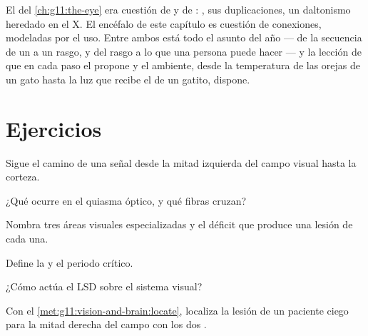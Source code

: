 \begin{remark}\label{rem:g11:vision-and-brain:year}
El  del \cref{ch:g11:the-eye} era cuestión de  y de :
, sus duplicaciones, un daltonismo heredado en el X. El encéfalo
de este capítulo es cuestión de conexiones, modeladas por el uso. Entre
ambos está todo el asunto del año --- de la secuencia de un  a un
rasgo, y del rasgo a lo que una persona puede hacer --- y la lección de
que en cada paso el  propone y el ambiente, desde la
temperatura de las orejas de un gato hasta la luz que recibe el  de
un gatito, dispone.
\end{remark}

\section{Ejercicios}

\begin{exercise}[$\star$]\label{exo:g11:vision-and-brain:1}
Sigue el camino de una señal desde la mitad izquierda del campo visual
hasta la corteza.
\end{exercise}

\begin{exercise}[$\star$]\label{exo:g11:vision-and-brain:2}
¿Qué ocurre en el quiasma óptico, y qué fibras cruzan?
\end{exercise}

\begin{exercise}[$\star$]\label{exo:g11:vision-and-brain:3}
Nombra tres áreas visuales especializadas y el déficit que produce una
lesión de cada una.
\end{exercise}

\begin{exercise}[$\star$]\label{exo:g11:vision-and-brain:4}
Define la  y el periodo crítico.
\end{exercise}

\begin{exercise}[$\star$]\label{exo:g11:vision-and-brain:5}
¿Cómo actúa el LSD sobre el sistema visual?
\end{exercise}

\begin{exercise}[$\star\star$]\label{exo:g11:vision-and-brain:6}
Con el \cref{met:g11:vision-and-brain:locate}, localiza la lesión de un
paciente ciego para la mitad derecha del campo con los dos .
\end{exercise}

